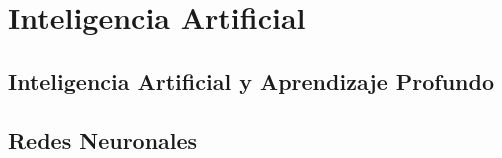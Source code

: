 \chapter{Inteligencia Artificial}\label{ch:IA}

\section{Inteligencia Artificial y Aprendizaje Profundo}
\section{Redes Neuronales}
